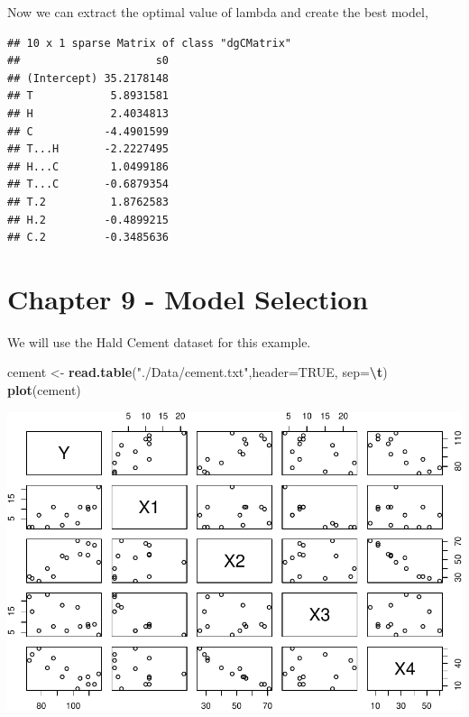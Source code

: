 \documentclass[
  11pt,
]{article}
\newenvironment{Shaded}{\begin{snugshade}}{\end{snugshade}}
\newcommand{\AttributeTok}[1]{\textcolor[rgb]{0.13,0.29,0.53}{#1}}
\newcommand{\ConstantTok}[1]{\textcolor[rgb]{0.56,0.35,0.01}{#1}}
\newcommand{\DecValTok}[1]{\textcolor[rgb]{0.00,0.00,0.81}{#1}}
\newcommand{\FunctionTok}[1]{\textcolor[rgb]{0.13,0.29,0.53}{\textbf{#1}}}
\newcommand{\NormalTok}[1]{#1}
\newcommand{\OtherTok}[1]{\textcolor[rgb]{0.56,0.35,0.01}{#1}}
\newcommand{\SpecialCharTok}[1]{\textcolor[rgb]{0.81,0.36,0.00}{\textbf{#1}}}
\newcommand{\StringTok}[1]{\textcolor[rgb]{0.31,0.60,0.02}{#1}}
\begin{document}
Now we can extract the optimal value of lambda and create the best
model,

\begin{Shaded}
\end{Shaded}

\begin{verbatim}
## 10 x 1 sparse Matrix of class "dgCMatrix"
##                     s0
## (Intercept) 35.2178148
## T            5.8931581
## H            2.4034813
## C           -4.4901599
## T...H       -2.2227495
## H...C        1.0499186
## T...C       -0.6879354
## T.2          1.8762583
## H.2         -0.4899215
## C.2         -0.3485636
\end{verbatim}

\section{Chapter 9 - Model Selection}\label{chapter-9---model-selection}

We will use the Hald Cement dataset for this example.

\begin{Shaded}
\begin{Highlighting}[]
\NormalTok{cement }\OtherTok{\textless{}{-}} \FunctionTok{read.table}\NormalTok{(}\StringTok{"./Data/cement.txt"}\NormalTok{,}\AttributeTok{header=}\ConstantTok{TRUE}\NormalTok{, }\AttributeTok{sep=}\StringTok{\textquotesingle{}}\SpecialCharTok{\textbackslash{}t}\StringTok{\textquotesingle{}}\NormalTok{)}
\FunctionTok{plot}\NormalTok{(cement)}
\end{Highlighting}
\end{Shaded}

\includegraphics{examples_files/figure-latex/unnamed-chunk-58-1.pdf}
\end{document}
